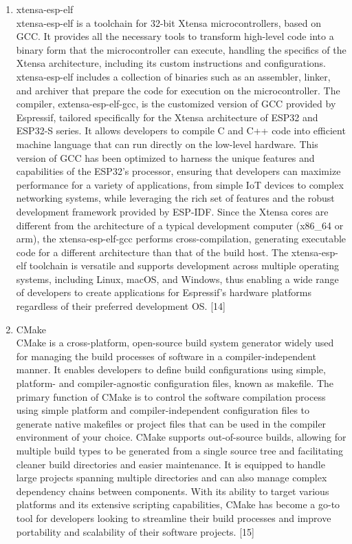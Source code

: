 \documentclass[conference]{IEEEtran}
\begin{document}
\begin{enumerate}[label=\arabic*.]
\begin{enumerate}[label=\alph*.]
\item xtensa-esp-elf\\
xtensa-esp-elf is a toolchain for 32-bit Xtensa microcontrollers, based on GCC. It provides all the necessary tools to transform high-level code into a binary form that the microcontroller can execute, handling the specifics of the Xtensa architecture, including its custom instructions and configurations. xtensa-esp-elf includes a collection of binaries such as an assembler, linker, and archiver that prepare the code for execution on the microcontroller. The compiler, extensa-esp-elf-gcc, is the customized version of GCC provided by Espressif, tailored specifically for the Xtensa architecture of ESP32 and ESP32-S series. It allows developers to compile C and C++ code into efficient machine language that can run directly on the low-level hardware. This version of GCC has been optimized to harness the unique features and capabilities of the ESP32's processor, ensuring that developers can maximize performance for a variety of applications, from simple IoT devices to complex networking systems, while leveraging the rich set of features and the robust development framework provided by ESP-IDF. Since the Xtensa cores are different from the architecture of a typical development computer (x86\_64 or arm), the xtensa-esp-elf-gcc performs cross-compilation, generating executable code for a different architecture than that of the build host. The xtensa-esp-elf toolchain is versatile and supports development across multiple operating systems, including Linux, macOS, and Windows, thus enabling a wide range of developers to create applications for Espressif's hardware platforms regardless of their preferred development OS. [14]\\
\item CMake\\
CMake is a cross-platform, open-source build system generator widely used for managing the build processes of software in a compiler-independent manner. It enables developers to define build configurations using simple, platform- and compiler-agnostic configuration files, known as makefile. The primary function of CMake is to control the software compilation process using simple platform and compiler-independent configuration files to generate native makefiles or project files that can be used in the compiler environment of your choice. CMake supports out-of-source builds, allowing for multiple build types to be generated from a single source tree and facilitating cleaner build directories and easier maintenance. It is equipped to handle large projects spanning multiple directories and can also manage complex dependency chains between components. With its ability to target various platforms and its extensive scripting capabilities, CMake has become a go-to tool for developers looking to streamline their build processes and improve portability and scalability of their software projects. [15]\\

\end{enumerate}
\end{enumerate}
\end{document}
